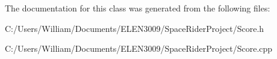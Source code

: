 The documentation for this class was generated from the following files\+:\begin{DoxyCompactItemize}
\item 
C\+:/\+Users/\+William/\+Documents/\+E\+L\+E\+N3009/\+Space\+Rider\+Project/Score.\+h\item 
C\+:/\+Users/\+William/\+Documents/\+E\+L\+E\+N3009/\+Space\+Rider\+Project/Score.\+cpp\end{DoxyCompactItemize}
